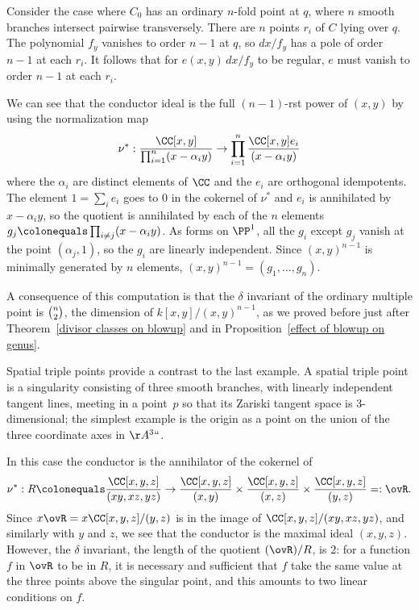 \begin{example}\label{ord n-fold}
Consider the case where $C_{0}$ has an ordinary $n$-fold point at  $q$,
where
$n$
smooth branches intersect pairwise transversely.
There are
$n$ points
$r_i$ of $C$ lying over $q$. The polynomial $f_y$ vanishes to order $n-1$
at $q$, so $dx/f_y$ has a pole of order $n-1$ at
each $r_i$. It follows that for $e(x,y)\,dx/f_y$ to be regular, $e$ must
vanish to order $n-1$ at each $r_i$.

We can see that the conductor ideal is the full $(n-1)$-rst power of
$(x,y)$ by using the
normalization map
$$
\nu^{*}: \frac{\CC[x,y]}{\prod_{i=1}^{n} (x-\alpha_{i}y)} \to
 \prod_{i=1}^{n} \frac{\CC[x,y]e_{i}}{(x-\alpha_{i}y)}
$$
where the $\alpha_{i}$ are distinct elements of $\CC$ and the $e_{i}$
are orthogonal idempotents.
The element $1 = \sum_{i}e_{i}$ goes to 0 in the cokernel of $\nu^{*}$
and $e_{i}$
is annihilated by $x-\alpha_{i}y$,
so the quotient is annihilated by each of the $n$ elements $g_{j}
\colonequals  \prod_{i\neq j} (x-\alpha_{i}y)$.
As forms on $\PP^{1}$, all the $g_{i}$ except $g_{j}$ vanish at the
point $(\alpha_{j}, 1)$, so the $g_{i}$ are linearly independent. Since
$(x,y)^{n-1}$ is minimally generated by $n$ elements, $(x,y)^{n-1} =
(g_{1}, \dots, g_{n})$.

A consequence of this computation is that the $\delta$ invariant of the
%
ordinary multiple point is $\tbinom{n}{2}$, the dimension of
%
$k[x,y]/(x,y)^{n-1}$, as we proved before just after
Theorem~\ref{divisor classes on blowup} and in 
Proposition~\ref{effect of blowup on genus}.
\end{example}

\begin{example}
Spatial triple points provide a contrast to the last example. A
spatial triple point is a singularity consisting of three smooth
branches, with linearly independent tangent lines, meeting 
in a point~$p$ so that its Zariski tangent space is 3-dimensional; the simplest
example is the origin as a point on the union of the three coordinate
axes in $\AA^3` `$.

In this case the conductor is the annihilator of the cokernel of
\vspace{3pt}
$$
\nu^{*}: R \colonequals  \frac{\CC[x,y,z]}{(xy, xz, yz)} \to
\frac{\CC[x,y,z]}{(x,y)} \times \frac{\CC[x,y,z]}{(x,z)} \times
\frac{\CC[x,y,z]}{(y,z)} =: \ovR.
$$
Since $x\ovR = x \CC[x,y,z]/(y,z)$ is in the image of
$\CC[x,y,z]/(xy, xz, yz)$, and similarly with $y$ and $z$,
we see that the conductor is the maximal ideal $(x,y,z)$. However,
the $\delta$ invariant, the length
%
of the quotient $(\ovR)/R$, is 2: for a function $f$ in $\ovR$ to be in $R$, it
is necessary and sufficient that $f$ take the same value at the three
points above the singular point,
and this 
amounts to two
linear conditions on $f$.
\end{example}

